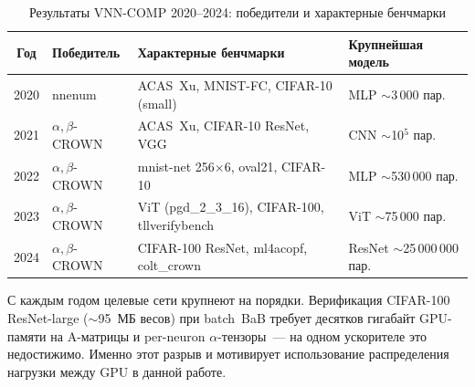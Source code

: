 \begin{table}[htbp]
\centering
\small
\caption{Результаты VNN-COMP 2020--2024:
победители и характерные бенчмарки}
\label{tab:vnncomp}
\begin{tabular}{clp{5.5cm}l}
\toprule
Год & Победитель & Характерные бенчмарки & Крупнейшая модель \\
\midrule
2020 & nnenum
     & ACAS~Xu, MNIST-FC, CIFAR-10 (small)
     & MLP $\sim$3\,000 пар. \\
2021 & $\alpha,\beta$-CROWN
     & ACAS~Xu, CIFAR-10 ResNet, VGG
     & CNN $\sim$10$^5$ пар. \\
2022 & $\alpha,\beta$-CROWN
     & mnist-net 256$\times$6, oval21, CIFAR-10
     & MLP $\sim$530\,000 пар. \\
2023 & $\alpha,\beta$-CROWN
     & ViT (pgd\_2\_3\_16), CIFAR-100, tllverifybench
     & ViT $\sim$75\,000 пар. \\
2024 & $\alpha,\beta$-CROWN
     & CIFAR-100 ResNet, ml4acopf, colt\_crown
     & ResNet $\sim$25\,000\,000 пар. \\
\bottomrule
\end{tabular}
\end{table}

С каждым годом целевые сети крупнеют на порядки.
Верификация CIFAR-100 ResNet-large ($\sim$95~МБ весов) при batch~BaB
требует десятков гигабайт GPU-памяти на A-матрицы и per-neuron
$\alpha$-тензоры~--- на одном ускорителе это недостижимо.
Именно этот разрыв и мотивирует использование распределения нагрузки между GPU в данной работе.
